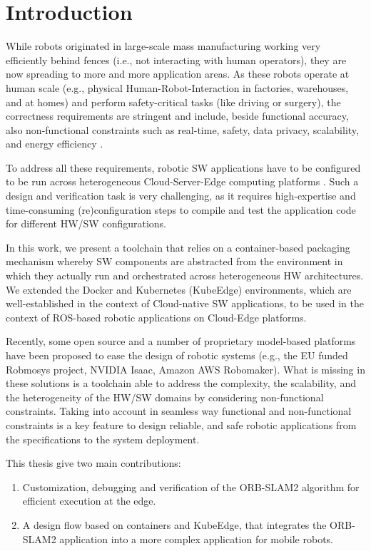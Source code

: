 \chapter{Introduction}
While robots originated in large-scale mass manufacturing working very efficiently behind fences (i.e., not interacting with human operators), they are now spreading to more and more application areas. As these robots operate at human scale (e.g., physical Human-Robot-Interaction in factories, warehouses, and at homes) and perform safety-critical tasks (like driving or surgery), the correctness requirements are stringent and include, beside functional accuracy, also non-functional constraints such as real-time, safety, data privacy, scalability, and energy efficiency \cite{robotchallanges}.

To address all these requirements, robotic SW applications have to be configured to be run across heterogeneous Cloud-Server-Edge computing platforms \cite{deepedgerev}. Such a design and verification task is very challenging, as it requires high-expertise and time-consuming (re)configuration steps to compile and test the application code for different HW/SW configurations.

In this work, we present a toolchain that relies on a container-based packaging mechanism whereby SW components are abstracted from the environment in which they actually run and orchestrated across heterogeneous HW architectures. We extended the Docker and Kubernetes (KubeEdge) environments, which are well-established in the context of Cloud-native SW applications, to be used in the context of ROS-based robotic applications on Cloud-Edge platforms.

Recently, some open source and a number of proprietary model-based platforms have been proposed to ease the design of robotic systems (e.g., the EU funded Robmosys project, NVIDIA Isaac, Amazon AWS Robomaker). What is missing in these solutions is a toolchain able to address the complexity, the scalability, and the heterogeneity of the HW/SW domains by considering non-functional constraints. Taking into account in seamless way functional and non-functional constraints is a key feature to design reliable, and safe robotic applications from the specifications to the system deployment.

This thesis give two main contributions:
\begin{enumerate}
	\item Customization, debugging and verification of the ORB-SLAM2 algorithm for efficient execution at the edge.
	\item A design flow based on containers and KubeEdge, that integrates the ORB-SLAM2 application into a more complex application for mobile robots. 
\end{enumerate}

